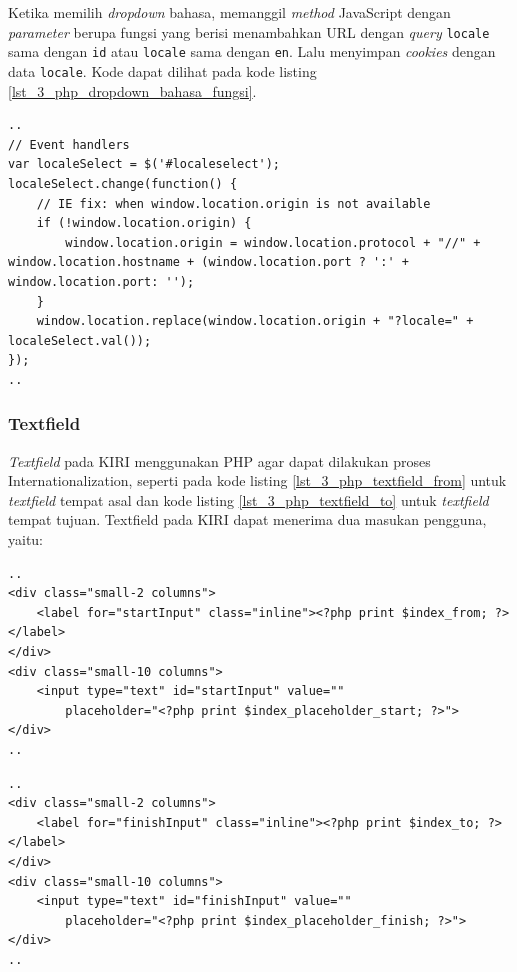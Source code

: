 Ketika memilih \textit{dropdown} bahasa, memanggil \textit{method} JavaScript dengan \textit{parameter} berupa fungsi yang berisi menambahkan URL dengan \textit{query} \verb!locale! sama dengan \verb!id! atau \verb!locale! sama dengan \verb!en!. Lalu menyimpan \textit{cookies} dengan data \verb!locale!. Kode dapat dilihat pada kode listing \ref{lst_3_php_dropdown_bahasa_fungsi}.

\begin{lstlisting}[caption=Fungsi JavaScript untuk Internationalization ,label = {lst_3_php_dropdown_bahasa_fungsi}]
..
// Event handlers
var localeSelect = $('#localeselect');
localeSelect.change(function() {
	// IE fix: when window.location.origin is not available 
	if (!window.location.origin) {
		window.location.origin = window.location.protocol + "//" + window.location.hostname + (window.location.port ? ':' + window.location.port: '');
	}
	window.location.replace(window.location.origin + "?locale=" + localeSelect.val());
});
..
\end{lstlisting}


\subsubsection{Textfield}
\textit{Textfield} pada KIRI menggunakan PHP agar dapat dilakukan proses Internationalization, seperti pada kode listing \ref{lst_3_php_textfield_from} untuk \textit{textfield} tempat asal dan kode listing \ref{lst_3_php_textfield_to} untuk \textit{textfield} tempat tujuan. Textfield pada KIRI dapat menerima dua masukan pengguna, yaitu:

\begin{lstlisting}[caption=Menampilkan \textit{textfield} tempat awal kepada pengguna ,label = {lst_3_php_textfield_from}]
..
<div class="small-2 columns">
	<label for="startInput" class="inline"><?php print $index_from; ?></label>
</div>
<div class="small-10 columns">
	<input type="text" id="startInput" value=""
		placeholder="<?php print $index_placeholder_start; ?>">
</div>
..
\end{lstlisting}

\begin{lstlisting}[caption=Menampilkan \textit{textfield} tempat tujuan kepada pengguna ,label = {lst_3_php_textfield_to}]
..
<div class="small-2 columns">
	<label for="finishInput" class="inline"><?php print $index_to; ?></label>
</div>
<div class="small-10 columns">
	<input type="text" id="finishInput" value=""
		placeholder="<?php print $index_placeholder_finish; ?>">
</div>
..
\end{lstlisting}

